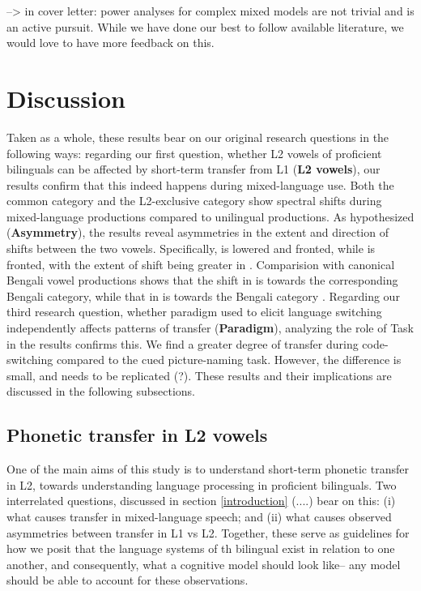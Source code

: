 \documentclass[12 pt]{article}
\newcommand{\nt}[1]{\textipa{[#1]}} %
\begin{document}
--> in cover letter: power analyses for complex mixed models are not trivial and is an active pursuit. While we have done our best to follow available literature, we would love to have more feedback on this. 


\section{Discussion}

Taken as a whole, these results bear on our original research questions in the following ways: regarding our first question, whether L2 vowels of proficient bilinguals can be affected by short-term transfer from L1 (\textbf{L2 vowels}), our results confirm that this indeed happens during mixed-language use. Both the common category \nt{\ae} and the L2-exclusive category \nt{2} show spectral shifts during mixed-language productions compared to unilingual productions. As hypothesized (\textbf{Asymmetry}), the results reveal asymmetries in the extent and direction of shifts between the two vowels. Specifically, \nt{2} is lowered and fronted, while \nt{\ae} is fronted, with the extent of shift being greater in \nt{2}. Comparision with canonical Bengali vowel productions shows that the shift in \nt{\ae} is towards the corresponding Bengali category, while that in \nt{2} is towards the Bengali category \nt{a:}. Regarding our third research question, whether paradigm used to elicit language switching independently affects patterns of transfer (\textbf{Paradigm}), analyzing the role of Task in the results confirms this. We find a greater degree of transfer during code-switching compared to the cued picture-naming task. However, the difference is small, and needs to be replicated (?). These results and their implications are discussed in the following subsections.


\subsection{Phonetic transfer in L2 vowels}

One of the main aims of this study is to understand short-term phonetic transfer in L2, towards understanding language processing in proficient bilinguals. Two interrelated questions, discussed in section \ref{introduction} (....) bear on this: (i) what causes transfer in mixed-language speech; and (ii) what causes observed asymmetries between transfer in L1 vs L2. Together, these serve as guidelines for how we posit that the language systems of th bilingual exist in relation to one another, and consequently, what a cognitive model should look like-- any model should be able to account for these observations. 
\end{document}
